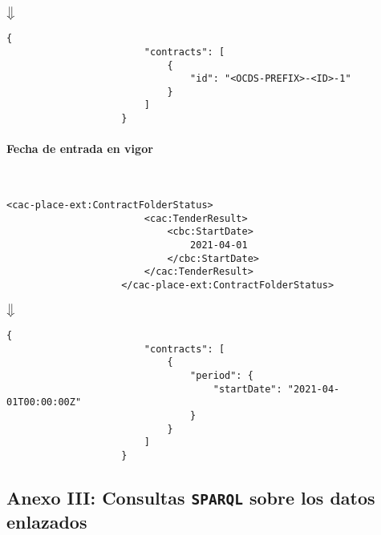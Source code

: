                 \begin{center}
                    $\big\Downarrow$
                \end{center}
\newpage
                \begin{lstlisting}[language=lJSON]
                    {
                        "contracts": [
                            {
                                "id": "<OCDS-PREFIX>-<ID>-1"
                            }
                        ]
                    }
                \end{lstlisting}
                
            \paragraph{Fecha de entrada en vigor} \mbox{}\\
                \begin{lstlisting}[language=lXML]
                    <cac-place-ext:ContractFolderStatus>
                        <cac:TenderResult>
                            <cbc:StartDate>
                                2021-04-01
                            </cbc:StartDate>
                        </cac:TenderResult>
                    </cac-place-ext:ContractFolderStatus>
                \end{lstlisting}
                
                \begin{center}
                    $\big\Downarrow$
                \end{center}
                
                \begin{lstlisting}[language=lJSON]
                    {
                        "contracts": [
                            {
                                "period": {
                                    "startDate": "2021-04-01T00:00:00Z"
                                }
                            }
                        ]
                    }
                \end{lstlisting}

\newpage

    \subsection{Anexo III: Consultas \texttt{SPARQL} sobre los datos enlazados} \label{annex:sparql}
